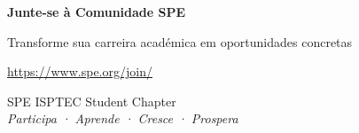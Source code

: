 \documentclass{beamer}
\begin{document}
\begin{frame}[plain]
  \centering
  
  \vspace{2cm}
  
  {\Huge\bfseries\color{spe-teal}Junte-se à Comunidade SPE}
  
  \vspace{1cm}
  
  {\Large\color{spe-dark}Transforme sua carreira académica em oportunidades concretas}
  
  \vspace{1.5cm}
  
  {\Large\color{spe-accent}\url{https://www.spe.org/join/}}
  
  \vspace{1.5cm}
  
  {\normalsize\color{spe-dark}SPE ISPTEC Student Chapter\\[0.3cm]
  \textit{Participa · Aprende · Cresce · Prospera}}
  
  \vspace{2cm}
\end{frame}
\end{document}
